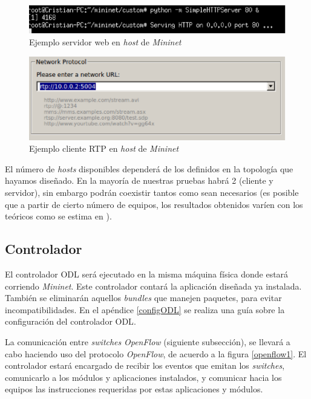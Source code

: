 \documentclass[a4paper,11pt]{book}
\begin{document}
\begin{figure}[tb]
\centering
\includegraphics[scale=1]{./figuras/server}
\caption{Ejemplo servidor web en \textit{host} de \emph{Mininet}}\label{server}
\end{figure}

\begin{figure}[tb]
\centering
\includegraphics[scale=0.5]{./figuras/client}
\caption{Ejemplo cliente \ac{RTP} en \textit{host} de \emph{Mininet}}\label{client}
\end{figure}

El número de \textit{hosts} disponibles dependerá de los definidos en la topología que hayamos diseñado. En la mayoría de nuestras pruebas habrá 2 (cliente y servidor), sin embargo podrán coexistir tantos como sean necesarios (es posible que a partir de cierto número de equipos, los resultados obtenidos varíen con los teóricos como se estima en \cite{wang2014comparison}).

\subsection{Controlador}
El controlador \ac{ODL} será ejecutado en la misma máquina física donde estará corriendo \emph{Mininet}. Este controlador contará la aplicación diseñada ya instalada. También se eliminarán aquellos \textit{bundles} que manejen paquetes, para evitar incompatibilidades. En el apéndice \ref{configODL} se realiza una guía sobre la configuración del controlador \ac{ODL}.

La comunicación entre \textit{switches} \emph{OpenFlow} (siguiente subsección), se llevará a cabo haciendo uso del protocolo \emph{OpenFlow}, de acuerdo a la figura \ref{openflow1}. El controlador estará encargado de recibir los eventos que emitan los \textit{switches}, comunicarlo a los módulos y aplicaciones instalados, y comunicar hacia los equipos las instrucciones requeridas por estas aplicaciones y módulos.
\end{document}
